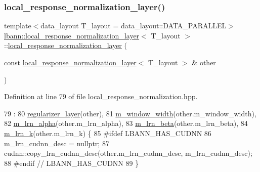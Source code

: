 \subsubsection{\texorpdfstring{local\+\_\+response\+\_\+normalization\+\_\+layer()}{local\_response\_normalization\_layer()}\hspace{0.1cm}{\footnotesize\ttfamily [2/2]}}
{\footnotesize\ttfamily template$<$data\+\_\+layout T\+\_\+layout = data\+\_\+layout\+::\+D\+A\+T\+A\+\_\+\+P\+A\+R\+A\+L\+L\+EL$>$ \\
\hyperlink{classlbann_1_1local__response__normalization__layer}{lbann\+::local\+\_\+response\+\_\+normalization\+\_\+layer}$<$ T\+\_\+layout $>$\+::\hyperlink{classlbann_1_1local__response__normalization__layer}{local\+\_\+response\+\_\+normalization\+\_\+layer} (\begin{DoxyParamCaption}\item[{const \hyperlink{classlbann_1_1local__response__normalization__layer}{local\+\_\+response\+\_\+normalization\+\_\+layer}$<$ T\+\_\+layout $>$ \&}]{other }\end{DoxyParamCaption})\hspace{0.3cm}{\ttfamily [inline]}}



Definition at line 79 of file local\+\_\+response\+\_\+normalization.\+hpp.


\begin{DoxyCode}
79                                                                                       :
80     \hyperlink{classlbann_1_1regularizer__layer_a2ebf3877b905b479a0250b74cf8f68b3}{regularizer\_layer}(other),
81     \hyperlink{classlbann_1_1local__response__normalization__layer_a4914619a19eb43efcf8240b8a1e0c090}{m\_window\_width}(other.m\_window\_width),
82     \hyperlink{classlbann_1_1local__response__normalization__layer_a85c25a68888e2e9d163a820326fc09ff}{m\_lrn\_alpha}(other.m\_lrn\_alpha),
83     \hyperlink{classlbann_1_1local__response__normalization__layer_ad06848e9d59664be86aecbc1e2ba556f}{m\_lrn\_beta}(other.m\_lrn\_beta),
84     \hyperlink{classlbann_1_1local__response__normalization__layer_a896f875d6f6a763c1cb0dbd43679164e}{m\_lrn\_k}(other.m\_lrn\_k) \{
85 \textcolor{preprocessor}{  #ifdef LBANN\_HAS\_CUDNN}
86     m\_lrn\_cudnn\_desc = \textcolor{keyword}{nullptr};
87     cudnn::copy\_lrn\_cudnn\_desc(other.m\_lrn\_cudnn\_desc, m\_lrn\_cudnn\_desc);
88 \textcolor{preprocessor}{  #endif // LBANN\_HAS\_CUDNN}
89   \}
\end{DoxyCode}
\mbox{\label{classlbann_1_1local__response__normalization__layer_a7896161e3667a69f0fd66cda3b4af421}} 

